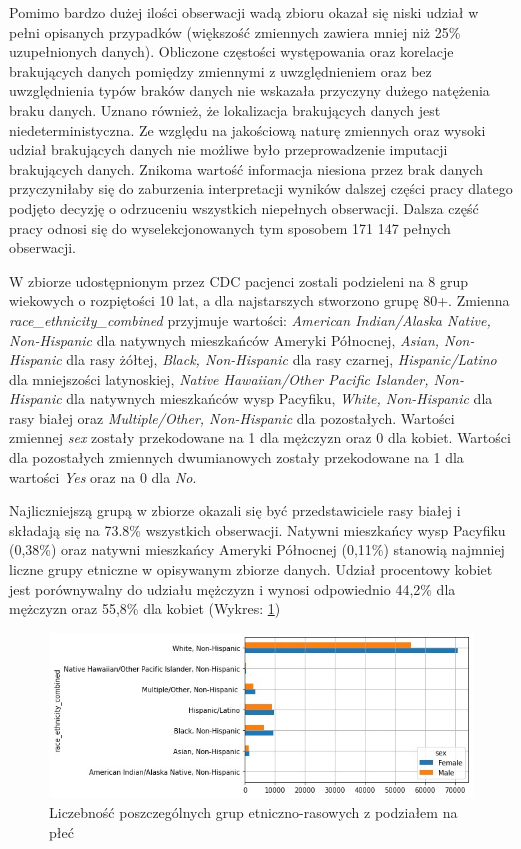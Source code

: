 \documentclass[polish, twoside, 12pt, a4paper]{article}
\theoremstyle{definition}
\theoremstyle{plain}
\theoremstyle{remark}
\begin{document}
Pomimo bardzo dużej ilości obserwacji wadą zbioru okazał się niski udział w pełni opisanych przypadków (większość zmiennych zawiera mniej niż 25\% uzupełnionych danych). Obliczone częstości występowania oraz korelacje brakujących danych pomiędzy zmiennymi z uwzględnieniem oraz bez uwzględnienia typów braków danych nie wskazała przyczyny dużego natężenia braku danych. Uznano również, że lokalizacja brakujących danych jest niedeterministyczna. Ze względu na jakościową naturę zmiennych oraz wysoki udział brakujących danych nie możliwe było przeprowadzenie imputacji brakujących danych. Znikoma wartość informacja niesiona przez brak danych przyczyniłaby się do zaburzenia interpretacji wyników dalszej części pracy dlatego podjęto decyzję o odrzuceniu wszystkich niepełnych obserwacji. Dalsza część pracy odnosi się do wyselekcjonowanych tym sposobem 171 147 pełnych obserwacji. 

W zbiorze udostępnionym przez CDC pacjenci zostali podzieleni na 8 grup wiekowych o rozpiętości 10 lat, a dla najstarszych stworzono grupę 80+. Zmienna \emph{race\_ethnicity\_combined} przyjmuje wartości: \emph{American Indian/Alaska Native, Non-Hispanic} dla natywnych mieszkańców Ameryki Północnej, \emph{Asian, Non-Hispanic} dla rasy żółtej, \emph{Black, Non-Hispanic} dla rasy czarnej, \emph{Hispanic/Latino} dla mniejszości latynoskiej, \emph{Native Hawaiian/Other Pacific Islander, Non-Hispanic} dla natywnych mieszkańców wysp Pacyfiku, \emph{White, Non-Hispanic} dla rasy białej oraz \emph{Multiple/Other, Non-Hispanic} dla pozostałych. Wartości zmiennej \emph{sex} zostały przekodowane na 1 dla mężczyzn oraz 0 dla kobiet. Wartości dla pozostałych zmiennych dwumianowych zostały przekodowane na 1 dla wartości \emph{Yes} oraz na 0 dla \emph{No}.

Najliczniejszą grupą w zbiorze okazali się być przedstawiciele rasy białej i składają się na 73.8\% wszystkich obserwacji. Natywni mieszkańcy wysp Pacyfiku (0,38\%) oraz natywni mieszkańcy Ameryki Północnej (0,11\%) stanowią najmniej liczne grupy etniczne w opisywanym zbiorze danych. Udział procentowy kobiet jest porównywalny do udziału mężczyzn i wynosi odpowiednio 44,2\% dla mężczyzn oraz 55,8\% dla kobiet (Wykres: \ref{figure:sex-race-count})

\begin{figure}[H]
\centering
\includegraphics[width=15cm]{race_sex_count_plot.jpg}
\caption{Liczebność poszczególnych grup etniczno-rasowych z podziałem na płeć}
\label{figure:sex-race-count}
\end{figure}
\end{document}
